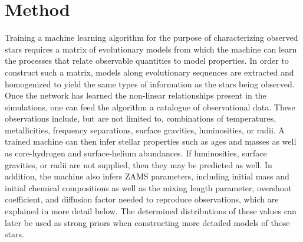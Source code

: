 \documentclass[manuscript]{aastex}
\begin{document}
\section{Method} \label{sec:Method} 
Training a machine learning algorithm for the purpose of characterizing observed stars requires a matrix of evolutionary models from which the machine can learn the processes that relate observable quantities to model properties. In order to construct such a matrix, models along evolutionary sequences are extracted and homogenized to yield the same types of information as the stars being observed. Once the network has learned the non-linear relationships present in the simulations, one can feed the algorithm a catalogue of observational data. These observations include, but are not limited to, combinations of temperatures, metallicities, frequency separations, surface gravities, luminosities, or radii. A trained machine can then infer stellar properties such as ages and masses as well as core-hydrogen and surface-helium abundances. If luminosities, surface gravities, or radii are not supplied, then they may be predicted as well. In addition, the machine also infers ZAMS parameters, including initial mass and initial chemical compositions as well as the mixing length parameter, overshoot coefficient, and diffusion factor needed to reproduce observations, which are explained in more detail below. The determined distributions of these values can later be used as strong priors when constructing more detailed models of those stars. 
\end{document}
